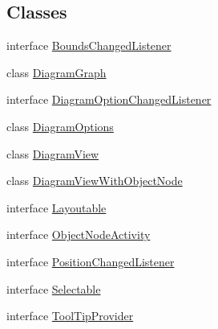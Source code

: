 \subsection*{Classes}
\begin{DoxyCompactItemize}
\item 
interface \hyperlink{interfaceorg_1_1tzi_1_1use_1_1gui_1_1views_1_1diagrams_1_1_bounds_changed_listener}{Bounds\-Changed\-Listener}
\item 
class \hyperlink{classorg_1_1tzi_1_1use_1_1gui_1_1views_1_1diagrams_1_1_diagram_graph}{Diagram\-Graph}
\item 
interface \hyperlink{interfaceorg_1_1tzi_1_1use_1_1gui_1_1views_1_1diagrams_1_1_diagram_option_changed_listener}{Diagram\-Option\-Changed\-Listener}
\item 
class \hyperlink{classorg_1_1tzi_1_1use_1_1gui_1_1views_1_1diagrams_1_1_diagram_options}{Diagram\-Options}
\item 
class \hyperlink{classorg_1_1tzi_1_1use_1_1gui_1_1views_1_1diagrams_1_1_diagram_view}{Diagram\-View}
\item 
class \hyperlink{classorg_1_1tzi_1_1use_1_1gui_1_1views_1_1diagrams_1_1_diagram_view_with_object_node}{Diagram\-View\-With\-Object\-Node}
\item 
interface \hyperlink{interfaceorg_1_1tzi_1_1use_1_1gui_1_1views_1_1diagrams_1_1_layoutable}{Layoutable}
\item 
interface \hyperlink{interfaceorg_1_1tzi_1_1use_1_1gui_1_1views_1_1diagrams_1_1_object_node_activity}{Object\-Node\-Activity}
\item 
interface \hyperlink{interfaceorg_1_1tzi_1_1use_1_1gui_1_1views_1_1diagrams_1_1_position_changed_listener}{Position\-Changed\-Listener}
\item 
interface \hyperlink{interfaceorg_1_1tzi_1_1use_1_1gui_1_1views_1_1diagrams_1_1_selectable}{Selectable}
\item 
interface \hyperlink{interfaceorg_1_1tzi_1_1use_1_1gui_1_1views_1_1diagrams_1_1_tool_tip_provider}{Tool\-Tip\-Provider}
\end{DoxyCompactItemize}
